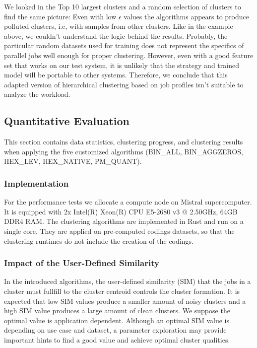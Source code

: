 \documentclass{jhps}
\begin{document}
We looked in the Top 10 largest clusters and a random selection of clusters to find the same picture:
Even with low $\epsilon$ values the algorithms appears to produce polluted clusters, i.e, with samples from other clusters.
Like in the example above, we couldn't understand the logic behind the results.
Probably, the particular random datasets used for training does not represent the specifics of parallel jobs  well enough for proper clustering.
However, even with a good feature set that works on our test system, it is unlikely that the strategy and trained model will be portable to other systems.
Therefore, we conclude that this adapted version of hierarchical clustering based on job profiles isn't suitable to analyze the workload.

\subsection{Quantitative Evaluation}
This section contains data statistics, clustering progress, and clustering results when applying the five customized algorithms (BIN\_ALL, BIN\_AGGZEROS, HEX\_LEV, HEX\_NATIVE, PM\_QUANT).

\subsubsection{Implementation}
For the performance tests we allocate a compute node on Mistral supercomputer.
It is equipped with 2x Intel(R) Xeon(R) CPU E5-2680 v3 @ 2.50GHz, 64GB DDR4 RAM.
The clustering algorithms are implemented in Rust and run on a single core.
They are applied on pre-computed codings datasets, so that the clustering runtimes do not include the creation of the codings.

\subsubsection{Impact of the User-Defined Similarity}
In the introduced algorithms, the user-defined similarity (SIM) that the jobs in a cluster must fullfill to the cluster centroid controls the cluster formation.
It is expected that low SIM values produce a smaller amount of noisy clusters and a high SIM value produces a large amount of clean clusters.
We suppose the optimal value is application dependent.
Although an optimal SIM value is depending on use case and dataset, a parameter exploration may provide important hints to find a good value and achieve optimal cluster qualities.
\end{document}
